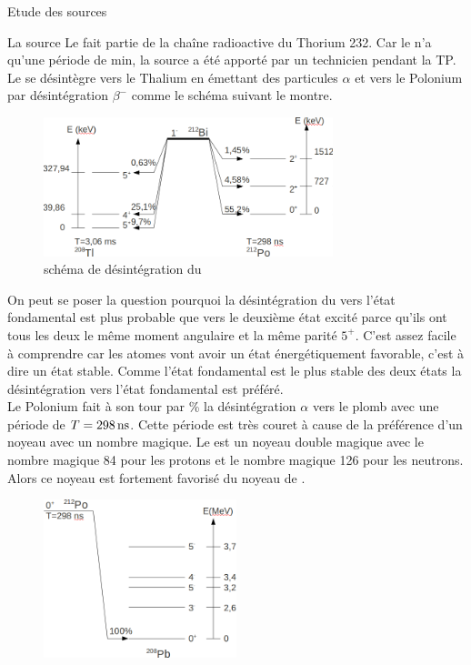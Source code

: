 \documentclass[a4paper,11pt]{scrartcl}
\begin{document}
\begin{section}{Etude des sources}
  \begin{subsection}{La source }
   Le  fait partie de la chaîne radioactive du Thorium 232. Car le   n'a qu'une période de \unit[60,5]{min}, la source a été apporté par un technicien pendant la TP. Le  se désintègre vers le Thalium  en émettant des particules $\alpha$  et vers le Polonium par désintégration $\beta^-$ comme le schéma suivant le montre.\\
   \begin{figure}[H]
    \begin{center}
     \includegraphics[width=0.75\textwidth]{Bilder/schemaBi1.png}
    \end{center}
    \caption{schéma de désintégration du  }
   \end{figure}
   On peut se poser la question pourquoi la désintégration du  vers l'état fondamental est plus probable que vers le deuxième état excité parce qu'ils ont tous les deux le même moment angulaire et la même parité $5^+$. C'est assez facile à comprendre car les atomes vont avoir un état énergétiquement favorable, c'est à dire un état stable. Comme l'état fondamental est le plus stable des deux états la désintégration vers l'état fondamental est préféré.\\
\newpage
   Le Polonium  fait à son tour par \unit[100]{\%} la désintégration $\alpha$ vers le plomb  avec une période de $T=\unit[298]{ns}$. Cette période est très couret à cause de la préférence d'un noyeau avec un nombre magique. Le  est un noyeau double magique avec le nombre magique 84 pour les protons et le nombre magique 126 pour les neutrons. Alors ce noyeau est fortement favorisé du noyeau de .
   \begin{figure}[H]
    \begin{center}
     \includegraphics[width=0.5\textwidth]{Bilder/schemaPo1.png}

\end{center}
\end{figure}
\end{subsection}
\end{section}
\end{document}
